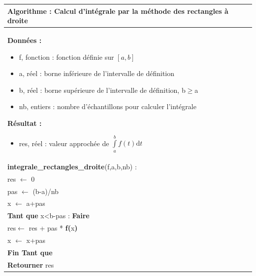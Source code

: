 \documentclass[10pt]{article}
\begin{document}
\begin{pseudo}
\begin{center}
\begin{tabular}{p{}}
\hline
\textbf{Algorithme :} Calcul d'intégrale par la méthode des rectangles à droite\\
\hline
\textbf{Données :}
\begin{itemize}
\item \textsf{f}, fonction : fonction définie sur $[a,b]$  
\item \textsf{a}, réel : borne inférieure de l'intervalle de définition
\item \textsf{b}, réel : borne supérieure de l'intervalle de définition, \textsf{b$\geq$a}
\item \textsf{nb}, entiers : nombre d'échantillons pour calculer l'intégrale
\end{itemize}
\textbf{Résultat :} 
\begin{itemize}
\item \textsf{res}, réel : valeur approchée de $\int\limits_a^b f(t)\text{d}t$
\end{itemize}
\\
\textbf{integrale\_rectangles\_droite}(\textsf{f,a,b,nb}) :\\
\hspace{.4cm}\textsf{res} $\leftarrow$ \textsf{0}\\
\hspace{.4cm}\textsf{pas} $\leftarrow$ \textsf{(b-a)/nb}\\
\hspace{.4cm}\textsf{x} $\leftarrow$ \textsf{a+pas}\\
\hspace{.4cm}\textbf{Tant que} \textsf{x<b-pas} : \textbf{Faire}\\
\hspace{.8cm}\textsf{res}$\leftarrow$ \textsf{res + pas *} \textbf{f(}\textsf{x}\textbf{)}\\
\hspace{.8cm}\textsf{x} $\leftarrow$ \textsf{x+pas}\\
\hspace{.4cm}\textbf{Fin Tant que} \\
\hspace{.4cm}\textbf{Retourner} \textsf{res}\\
\hline
\end{tabular}
\end{center}
\end{pseudo}
\end{document}
